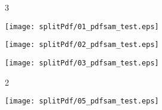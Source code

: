 \documentclass[portrait,a0c,final]{a0poster}
\newenvironment{poster}{
  \begin{center}
  \begin{minipage}[c]{0.99\textwidth}
}{
  \end{minipage} 
  \end{center}
}
\newenvironment{pcolumn}[1]{
  \begin{minipage}{#1\textwidth}
  \begin{center}
}{
  \end{center}
  \end{minipage}
}
\newcommand{\pbox}[4]{
\psshadowbox[#3]{
\begin{minipage}[t][#2][t]{#1}
#4
\end{minipage}
}}
\begin{document}
\begin{poster}
\begin{multicols}{3}
\begin{pcolumn}{0.33}
\texttt{[image: splitPdf/01\_pdfsam\_test.eps]}

\end{pcolumn}
\begin{pcolumn}{0.33}

\texttt{[image: splitPdf/02\_pdfsam\_test.eps]}

\end{pcolumn}

\begin{pcolumn}{0.33}
\texttt{[image: splitPdf/03\_pdfsam\_test.eps]}


\end{pcolumn}
 \end{multicols}
 \begin{multicols}{2}

\begin{pcolumn}{0.5}

 \texttt{[image: splitPdf/05\_pdfsam\_test.eps]}
  \end{pcolumn}


\begin{pcolumn}{0.5}


\end{pcolumn}
\end{multicols}
\end{poster}
\end{document}
